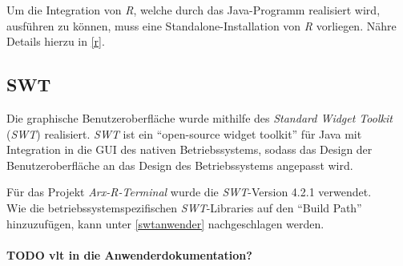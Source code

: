 \documentclass[a4paper, 12pt]{report} %
\begin{document}
Um die Integration von \textit{R}, welche durch das Java-Programm realisiert wird, ausführen zu können, muss eine Standalone-Installation von \textit{R} vorliegen. Nähre Details hierzu in \ref{r}.
 

\subsection{SWT}\label{swt} 
Die graphische Benutzeroberfläche wurde mithilfe des \textit{Standard Widget Toolkit} (\textit{SWT}) realisiert. \textit{SWT} ist ein "`open-source widget toolkit"' für Java mit Integration in die GUI des nativen Betriebssystems, sodass das Design der Benutzeroberfläche an das Design des Betriebssystems angepasst wird. 

Für das Projekt \textit{Arx-R-Terminal} wurde die \textit{SWT}-Version 4.2.1 verwendet.\\

Wie die betriebssystemspezifischen \textit{SWT}-Libraries auf den "`Build Path"' hinzuzufügen, kann unter \ref{swtanwender} nachgeschlagen werden.\\
\\
\textbf{TODO vlt in die Anwenderdokumentation?}\\

\label{swtanwender}
\end{document}
